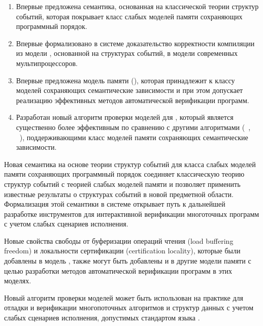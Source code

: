 {\novelty}
\begin{enumerate}[beginpenalty=10000] %

  \item Впервые предложена семантика, основанная на классической теории структур событий,
    которая покрывает класс слабых моделей памяти сохраняющих программный порядок.

  \item Впервые формализовано в системе \coq доказательство корректности компиляции
    из модели \Wkm, основанной на структурах событий, 
    в модели современных мультипроцессоров.  

  \item Впервые предложена модель памяти (\WkmS),
    которая принадлежит к классу моделей сохраняющих семантические зависимости 
    и при этом допускает реализацию эффективных методов автоматической верификации программ. 

  \item Разработан новый алгоритм проверки моделей для \WkmS,
    который является существенно более эффективным по сравнению с другими алгоритмами
    (\CDSChecker~\autocite{Norris-Demsky:OOPSLA2013}, \rmem~\autocite{Pulte-al:PLDI2019}),
    поддерживающими класс моделей памяти сохраняющих семантические зависимости.

\end{enumerate}

{\influence} 

Новая семантика на основе теории структур событий 
для класса слабых моделей памяти сохраняющих программный порядок
соединяет классическую теорию структур событий 
с теорией слабых моделей памяти и позволяет применить известные результаты 
о структурах событий в новой предметной области.  
Формализация этой семантики в системе \coq открывает 
путь к дальнейшей разработке инструментов для  
интерактивной верификации многоточных программ  
с учетом слабых сценариев исполнения. 
 
Новые свойства свободы от буферизации операций чтения (load buffering freedom)
и локальности сертификации (certification locality), 
которые были добавлены в модель \WkmS, 
также могут быть добавлены и в другие модели памяти 
с целью разработки методов автоматической верификации программ в этих моделях. 

Новый алгоритм проверки моделей может быть использован на практике
для отладки и верификации многопоточных алгоритмов и структур данных 
с учетом слабых сценариев исполнения, допустимых стандартом языка \CLANG. 

